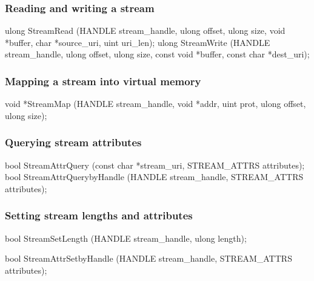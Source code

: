 \subsubsection*{Reading and writing a stream}

\begin{paldef}
ulong StreamRead (HANDLE stream_handle,
                  ulong offset, ulong size, void *buffer,
                  char *source_uri, uint uri_len);
ulong StreamWrite (HANDLE stream_handle,
                   ulong offset, ulong size,
                   const void *buffer,
                   const char *dest_uri);
\end{paldef}


\subsubsection*{Mapping a stream into virtual memory}

\begin{paldef}
void *StreamMap (HANDLE stream_handle, void *addr,
                 uint prot, ulong offset, ulong size);
\end{paldef}



\subsubsection*{Querying stream attributes}

\begin{paldef}
bool StreamAttrQuery (const char *stream_uri,
                      STREAM_ATTRS attributes);
bool StreamAttrQuerybyHandle (HANDLE stream_handle,
                              STREAM_ATTRS attributes);
\end{paldef}



\subsubsection*{Setting stream lengths and attributes}


\begin{paldef}
bool StreamSetLength (HANDLE stream_handle,
                      ulong length);
\end{paldef}


\begin{paldef}
bool StreamAttrSetbyHandle (HANDLE stream_handle,
                            STREAM_ATTRS attributes);
\end{paldef}




